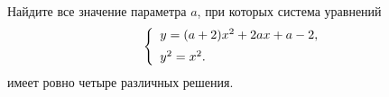 \begin{ex}
	\begin{condition}
		Найдите все значение параметра \( a \), при которых система уравнений
		\[ \left\{
		\begin{array}{l}
			y=(a+2)x^2+2ax+a-2,\vspace{2mm}\\
			y^2=x^2.
		\end{array}
		\right. \]
		имеет ровно четыре различных решения.
	\end{condition}
\end{ex}